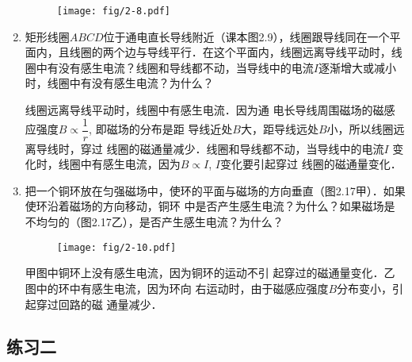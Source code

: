 \begin{enumerate}
\begin{figure}[htp]
\centering
\texttt{[image: fig/2-8.pdf]}
\caption{}
\end{figure}


    \item 矩形线圈$ABCD$位于通电直长导线附近（课本图2.9），线圈跟导线同在一个平面内，且线圈的两个边与导线平行．在这个平面内，线圈远离导线平动时，线圈中有没有感生电流？线圈和导线都不动，当导线中的电流$I$逐渐增大或减小时，线圈中有没有感生电流？为什么？

    \begin{solution}
    线圈远离导线平动时，线圈中有感生电流．因为通
电长导线周围磁场的磁感应强度$B\propto \dfrac{1}{r}$, 
即磁场的分布是距
导线近处$B$大，距导线远处$B$小，所以线圈远离导线时，穿过
线圈的磁通量减少．线圈和导线都不动，当导线中的电流$I$
变化时，线圈中有感生电流，因为$B\propto I$, $I$变化要引起穿过
线圈的磁通量变化．
    \end{solution}
    
    \item 把一个铜环放在匀强磁场中，使环的平面与磁场的方向垂直（图2.17甲）．如果使环沿着磁场的方向移动，铜环
中是否产生感生电流？为什么？如果磁场是不均匀的（图2.17乙），是否产生感生电流？为什么？
\begin{figure}[htp]\centering
\texttt{[image: fig/2-10.pdf]}
\caption{}
\end{figure}

\begin{solution}
    甲图中铜环上没有感生电流，因为铜环的运动不引
    起穿过的磁通量变化．乙图中的环中有感生电流，因为环向
    右运动时，由于磁感应强度$B$分布变小，引起穿过回路的磁
    通量减少．
\end{solution}

\end{enumerate}




\subsection{练习二}

